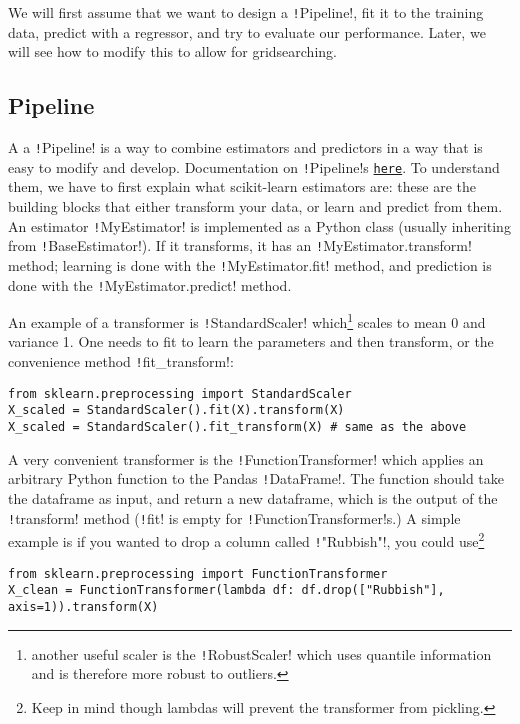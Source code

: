 \documentclass[11pt]{article}
\theoremstyle{definition}
\newcommand{\myhref}[2]{\href{#1}{\texttt{#2}}}
\begin{document}
We will first assume that we want to design a \texttt!Pipeline!, fit it to the training data, predict with a regressor, and try to evaluate our performance. Later, we will see how to modify this to allow for gridsearching.

\subsection{Pipeline}
A a \texttt!Pipeline! is a way to combine estimators and predictors in a way that is easy to modify and develop. Documentation on \texttt!Pipeline!s \myhref{https://scikit-learn.org/stable/modules/compose.html\#build-a-pipeline}{here}. To understand them, we have to first explain what scikit-learn estimators are: these are the building blocks that either transform your data, or learn and predict from them. 
An estimator \texttt!MyEstimator! is implemented as a Python class (usually inheriting from \texttt!BaseEstimator!). 
If it transforms, it has an \texttt!MyEstimator.transform! method;
learning is done with the \texttt!MyEstimator.fit! method, and
prediction is done with the \texttt!MyEstimator.predict! method. 

An example of a transformer is \texttt!StandardScaler! which\footnote{another useful scaler is the \texttt!RobustScaler! which uses quantile information and is therefore more robust to outliers.} scales to mean 0 and variance 1. 
One needs to fit to learn the parameters and then transform, or the convenience method \texttt!fit_transform!:
\begin{verbatim}
from sklearn.preprocessing import StandardScaler
X_scaled = StandardScaler().fit(X).transform(X) 
X_scaled = StandardScaler().fit_transform(X) # same as the above
\end{verbatim}
A very convenient transformer is the \texttt!FunctionTransformer! which applies an arbitrary Python function to the Pandas \texttt!DataFrame!. The function should take the dataframe as input, and return a new dataframe, which is the output of the \texttt!transform! method (\texttt!fit! is empty for \texttt!FunctionTransformer!s.) A simple example is if you wanted to drop a column called \texttt!"Rubbish"!, you could use\footnote{Keep in mind though lambdas will prevent the transformer from pickling.}
\begin{verbatim}
from sklearn.preprocessing import FunctionTransformer
X_clean = FunctionTransformer(lambda df: df.drop(["Rubbish"], axis=1)).transform(X)
\end{verbatim}
\end{document}
